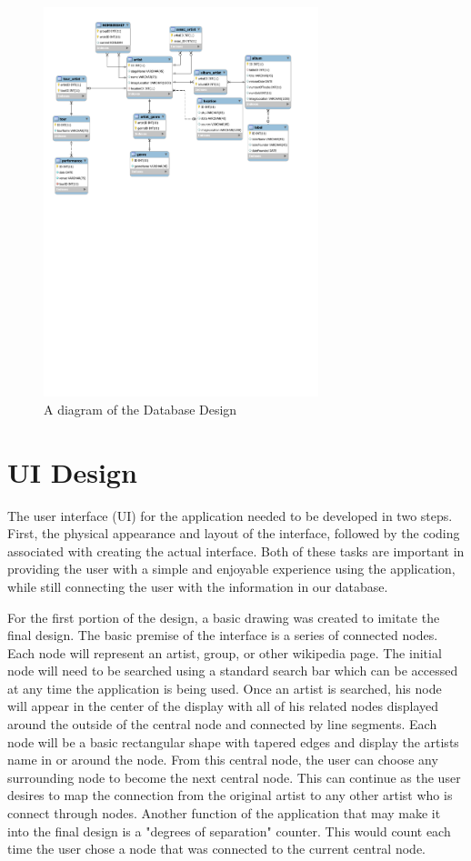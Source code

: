 \documentclass{sig-alternate}
\begin{document}
\begin{figure}[hbtp]
\centering
\includegraphics[width=8cm]{ArtistDB.pdf}
\caption{A diagram of the Database Design}
\label{ArtistDB}
\end{figure}

\section{UI Design}
\label{ui design}

The user interface (UI) for the application needed to be developed in two steps. First, the physical appearance 
and layout of the interface, followed by the coding associated with creating the actual interface. Both of these 
tasks are important in providing the user with a simple and enjoyable experience using the application, while 
still connecting the user with the information in our database. 

For the first portion of the design, a basic drawing was created to imitate the final design. The basic premise 
of the interface is a series of connected nodes. Each node will represent an artist, group, or other wikipedia 
page. The initial node will need to be searched using a standard search bar which can be accessed at any time 
the application is being used. Once an artist is searched, his node will appear in the center of the display 
with all of his related nodes displayed around the outside of the central node and connected by line segments. 
Each node will be a basic rectangular shape with tapered edges and display the artists name in or around the node. 
From this central node, the user can choose any surrounding node to become the next central node. This can continue 
as the user desires to map the connection from the original artist to any other artist who is connect through nodes.
Another function of the application that may make it into the final design is a "degrees of separation" counter. 
This would count each time the user chose a node that was connected to the current central node. 
\end{document}

